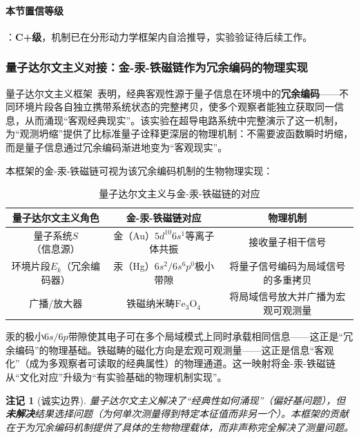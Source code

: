 \documentclass[12pt,a4paper,twocolumn]{article}
\newtheorem{remark}[theorem]{注记}
\begin{document}
\paragraph{本节置信等级}：\textbf{C+级}，机制已在分形动力学框架内自洽推导，实验验证待后续工作。

\subsubsection{量子达尔文主义对接：金-汞-铁磁链作为冗余编码的物理实现}
\label{subsec:darwinism}

量子达尔文主义框架~\cite{Zhu2025}表明，经典客观性源于量子信息在环境中的\textbf{冗余编码}——不同环境片段各自独立携带系统状态的完整拷贝，使多个观察者能独立获取同一信息，从而涌现``客观经典现实''。该实验在超导电路系统中完整演示了这一机制，为``观测坍缩''提供了比标准量子诠释更深层的物理机制：不需要波函数瞬时坍缩，而是量子信息通过冗余编码渐进地变为``客观现实''。

本框架的金-汞-铁磁链可视为该冗余编码机制的生物物理实现：

\begin{table}[H]
\centering
\caption{量子达尔文主义与金-汞-铁磁链的对应}
\begin{tabular}{c|c|c}
\hline
\textbf{量子达尔文主义角色} & \textbf{金-汞-铁磁链对应} & \textbf{物理机制} \\
\hline
量子系统$S$（信息源） & 金（Au）$5d^{10}6s^1$等离子体共振 & 接收量子相干信号 \\
环境片段$E_k$（冗余编码器） & 汞（Hg）$6s^2/6s^6p^0$极小带隙 & 将量子信号编码为局域信号的多重拷贝 \\
广播/放大器 & 铁磁纳米畴$\text{Fe}_3\text{O}_4$ & 将局域信号放大并广播为宏观可观测量 \\
\hline
\end{tabular}
\end{table}

汞的极小$6s/6p$带隙使其电子可在多个局域模式上同时承载相同信息——这正是``冗余编码''的物理基础。铁磁畴的磁化方向是宏观可观测量——这正是信息``客观化''（成为多观察者可读取的经典属性）的物理通道。这一映射将金-汞-铁磁链从``文化对应''升级为``有实验基础的物理机制实现''。

\begin{remark}[诚实边界]
量子达尔文主义解决了``经典性如何涌现''（偏好基问题），但\textbf{未解决}结果选择问题（为何单次测量得到特定本征值而非另一个）。本框架的贡献在于为冗余编码机制提供了具体的生物物理载体，而非声称完全解决了测量问题。
\end{remark}
\end{document}
